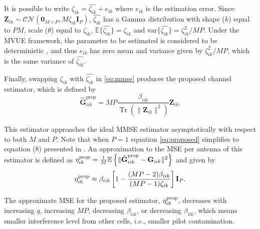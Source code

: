 \documentclass[10pt,journal,comsoc,final]{IEEEtran}
\DeclareMathOperator{\Tr}{Tr}
\begin{document}
It is possible to write $\zeta_{ik} = \hat{\zeta_{ik}} + e_{ik}$ where $e_{ik}$ is the estimation error. Since $\textbf{Z}_{ik} \sim \mathcal{CN}(\textbf{0}_{M \times P},M\zeta_{ik}\textbf{I}_{P})$, $ \hat{\zeta_{ik}}$ has a Gamma distribution with shape ($k$) equal to $PM$, scale ($\theta$) equal to $\zeta_{ik}$, $ \mathbb{E} \{ \hat{\zeta_{ik}} \} = \zeta_{ik}$ and $\text{var}\{ \hat{\zeta_{ik}} \} = \zeta_{ik}^{2}/MP$. Under the MVUE framework, the parameter to be estimated is considered to be deterministic \cite{kay:estimationbook}, and thus $e_{ik}$ has zero mean and variance given by $\zeta_{ik}^{2}/MP$, which is the same variance of $\hat{\zeta_{ik}}$.

Finally, swapping $\zeta_{ik}$ with $\hat{\zeta_{ik}}$ in \eqref{eq:mmse} produces the proposed channel estimator, which is defined by
\begin{equation}\label{eq:proposed}
\hat{\textbf{G}}_{iik}^{\text{prop}} = MP \frac{\beta_{iik}}{ \Tr \left( \lVert \textbf{Z}_{ik} \rVert^{2} \right) }\textbf{Z}_{ik}.
\end{equation}

This estimator approaches the ideal MMSE estimator asymptotically with respect to both $M$ and $P$. Note that when $P = 1$ equation \eqref{eq:proposed} simplifies to equation (8) presented in \cite{Amin:channelEstPilotCont}. An approximation to the MSE per antenna of this estimator is defined as $\eta_{ik}^{\text{\text{prop}}} = \frac{1}{M} \mathbb{E} \left\lbrace \lVert  \hat{\textbf{G}}_{iik}^{\text{prop}} - \textbf{G}_{iik} \rVert^{2} \right\rbrace$ and given by
\begin{equation}\label{eq:mse_prop}
\eta_{ik}^{\text{\text{prop}}} \approx \beta_{iik}  \left[  1 - \frac{(MP-2)\beta_{iik}}{(MP-1)\zeta_{ik}} \right] \textbf{I}_{P}.
\end{equation}

The approximate MSE for the proposed estimator, $\eta_{ik}^{\text{\text{prop}}}$, decreases with increasing $q$, increasing $MP$, decreasing $\beta_{iik}$, or decreasing $\beta_{ilk}$, which means smaller interference level from other cells, $i.e.$, smaller pilot contamination.
\end{document}
